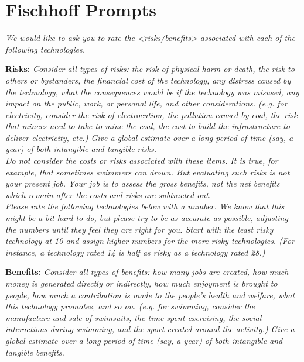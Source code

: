 \appendix

\section{Fischhoff Prompts}
\label{sec:prompt} 

\textit{We would like to ask you to rate the <risks/benefits> associated with each of the following technologies.}

{\bf Risks:} \textit{Consider all types of risks: the risk of physical harm or death, the risk to others or bystanders, the financial cost of the technology, any distress caused by the technology, what the consequences would be if the technology was misused, any impact on the public, work, or personal life, and other considerations. (e.g. for electricity, consider the risk of electrocution, the pollution caused by coal, the risk that miners need to take to mine the coal, the cost to build the infrastructure to deliver electricity, etc.) Give a global estimate over a long period of time (say, a year) of both intangible and tangible risks.} \\[-.6cm]

\textit{Do not consider the costs or risks associated with these items. It is true, for example, that sometimes swimmers can drown. But evaluating such risks is not your present job. Your job is to assess the gross benefits, not the net benefits which remain after the costs and risks are subtracted out.} \\[-.6cm]

\textit{Please rate the following technologies below with a number. We know that this might be a bit hard to do, but please try to be as accurate as possible, adjusting the numbers until they feel they are right for you. Start with the least risky technology at 10 and assign higher numbers for the more risky technologies. (For instance, a technology rated 14 is half as risky as a technology rated 28.)}

{\bf Benefits:} \textit{Consider all types of benefits: how many jobs are created, how much money is generated directly or indirectly, how much enjoyment is brought to people, how much a contribution is made to the people's health and welfare, what this technology promotes, and so on. (e.g. for swimming, consider the manufacture and sale of swimsuits, the time spent exercising, the social interactions during swimming, and the sport created around the activity.) Give a global estimate over a long period of time (say, a year) of both intangible and tangible benefits.} \\[-.6cm]

